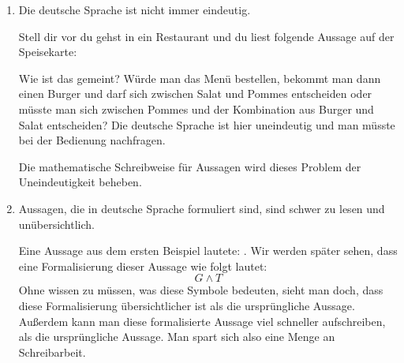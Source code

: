 \documentclass[../../main.tex]{subfiles}
\begin{document}
\begin{enumerate}
    \item Die deutsche Sprache ist nicht immer eindeutig. 
        \begin{example}{}
        Stell dir vor du gehst in ein Restaurant und du liest folgende Aussage auf der
        Speisekarte: 
        
         
         Wie ist das gemeint? Würde man das Menü bestellen, bekommt man dann einen Burger und darf sich zwischen Salat und Pommes entscheiden oder müsste man sich zwischen Pommes und der Kombination aus Burger und Salat entscheiden? Die deutsche Sprache ist hier uneindeutig und man müsste bei der Bedienung nachfragen.
         
        \end{example}
        Die mathematische Schreibweise für Aussagen wird dieses Problem der Uneindeutigkeit beheben.
    \item Aussagen, die in deutsche Sprache formuliert sind, sind schwer zu lesen und unübersichtlich.
    \begin{example}{}
        Eine Aussage aus dem ersten Beispiel lautete: . Wir werden später sehen, dass eine Formalisierung dieser Aussage wie folgt lautet:
        \[ G \land T\]
        Ohne wissen zu müssen, was diese Symbole bedeuten, sieht man doch, dass diese Formalisierung übersichtlicher ist als die ursprüngliche Aussage. Außerdem kann man diese formalisierte Aussage viel schneller aufschreiben, als die ursprüngliche Aussage. Man spart sich also eine Menge an Schreibarbeit.
    \end{example}
\end{enumerate}
\end{document}
